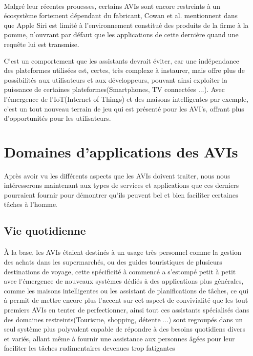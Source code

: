 \paragraph{}
Malgré leur récentes prouesses, certains AVIs sont encore restreints à un écosystème fortement dépendant du fabricant,  Cowan et al. mentionnent dans \cite{Cowan2017} que Apple Siri est limité à l'environnement constitué des produits de la firme à la pomme, n'ouvrant par défaut que les applications de cette dernière quand une requête lui est transmise.
\par C'est un comportement que les assistants devrait éviter, car une indépendance des plateformes utilisées est, certes, très complexe à instaurer, mais offre plus de possibilités aux utilisateurs et aux développeurs, pouvant ainsi exploiter la puissance de certaines plateformes(Smartphones, TV connectées ...).
Avec l'émergence de l'IoT(Internet of Things) et des maisons intelligentes  par exemple, c'est un tout nouveau terrain de jeu qui est présenté pour les AVI's, offrant plus d'opportunités pour les utilisateurs.
\section{Domaines d'applications des AVIs}
\paragraph{}
Après avoir vu les différents aspects que les AVIs doivent traiter, nous nous intéresserons maintenant aux types de services et applications que ces derniers pourraient fournir pour démontrer qu'ils peuvent bel et bien faciliter certaines tâches à l'homme.

\subsection{Vie quotidienne}
\paragraph{}
À la base, les AVIs étaient destinés à un usage très personnel comme la gestion des achats dans les supermarchés, ou des guides touristiques de plusieurs destinations de voyage, cette spécificité à commencé a s'estompé petit à petit avec l'émergence de nouveaux systèmes dédiés à des applications plus générales, comme les maisons intelligentes ou les assistant de planifications de tâches, ce qui à permit de mettre encore plus l'accent sur cet aspect de convivialité que les tout premiers AVIs en tenter de perfectionner, ainsi tout ces assistants spécialisés dans des domaines restreints(Tourisme, shopping, détente ...)   sont regroupés dans un seul système plus polyvalent capable de répondre à des besoins quotidiens divers et variés, allant même à fournir une assistance aux personnes âgées pour leur faciliter les tâches rudimentaires devenues trop fatigantes  
